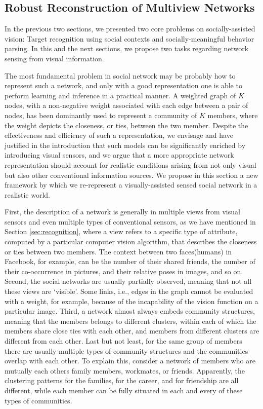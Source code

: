 \subsection{Robust Reconstruction of Multiview Networks}
\label{sec:reconstruct}

In the previous two sections, we presented two core problems on socially-assisted vision: Target recognition using social contexts and socially-meaningful behavior parsing. In this and the next sections, we propose two tasks regarding network sensing from visual information.

The most fundamental problem in social network may be probably how to represent such a network, and only with a good representation one is able to perform learning and inference in a practical manner. A weighted graph of $K$ nodes, with a non-negative weight associated with each edge between a pair of nodes, has been dominantly used to represent a community of $K$ members, where the weight depicts the closeness, or ties, between the two member. Despite the effectiveness and efficiency of such a representation, we envisage and have justified in the introduction that such models can be significantly enriched by introducing visual sensors, and we argue that a more appropriate network representation should account for realistic conditions arising from not only visual but also other conventional information sources. We propose in this section a new framework by which we re-represent a visually-assisted sensed social network in a realistic world.

First, the description of a network is generally in multiple views from visual sensors and even multiple types of conventional sensors, as we have mentioned in Section \ref{sec:recognition}, where a view refers to a specific type of attribute, computed by a particular computer vision algorithm, that describes the closeness or ties between two members. The context between two faces(humans) in Facebook, for example, can be the number of their shared friends, the number of their co-occurrence in pictures, and their relative poses in images, and so on. Second, the social networks are usually partially observed, meaning that not all these views are `visible'. Some links, i.e., edges in the graph cannot be evaluated with a weight, for example, because of the incapability of the vision function on a particular image. Third, a network almost always embeds community structures, meaning that the members belongs to different clusters, within each of which the members share close ties with each other, and members from different clusters are different from each other. Last but not least, for the same group of members there are usually multiple types of community structures and the communities overlap with each other. To explain this, consider a network of members who are mutually each others family members, workmates, or friends. Apparently, the clustering patterns for the families, for the career, and for friendship are all different, while each member can be fully situated in each and every of these types of communities.


